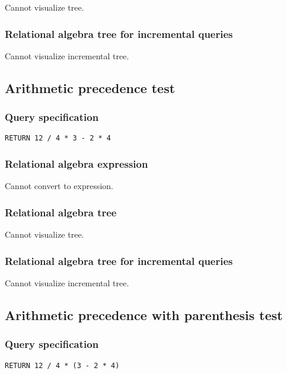 Cannot visualize tree.

\subsubsection*{Relational algebra tree for incremental queries}

Cannot visualize incremental tree.

\subsection{Arithmetic precedence test}

\subsubsection*{Query specification}

\begin{lstlisting}
RETURN 12 / 4 * 3 - 2 * 4
\end{lstlisting}

\subsubsection*{Relational algebra expression}

Cannot convert to expression.

\subsubsection*{Relational algebra tree}

Cannot visualize tree.

\subsubsection*{Relational algebra tree for incremental queries}

Cannot visualize incremental tree.

\subsection{Arithmetic precedence with parenthesis test}

\subsubsection*{Query specification}

\begin{lstlisting}
RETURN 12 / 4 * (3 - 2 * 4)
\end{lstlisting}

